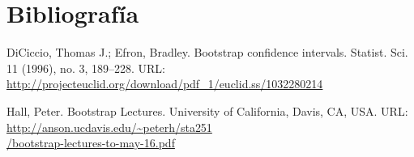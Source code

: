 \documentclass[11pt]{article}
\begin{document}
\section*{Bibliografía}

DiCiccio, Thomas J.; Efron, Bradley. Bootstrap confidence intervals. 
 Statist. Sci. 11 (1996), no. 3, 189--228. URL: \url{http://projecteuclid.org/download/pdf_1/euclid.ss/1032280214}

Hall, Peter. Bootstrap Lectures. University of California, Davis, CA, USA. URL: \url{http://anson.ucdavis.edu/~peterh/sta251}\\\url{/bootstrap-lectures-to-may-16.pdf}
\end{document}
